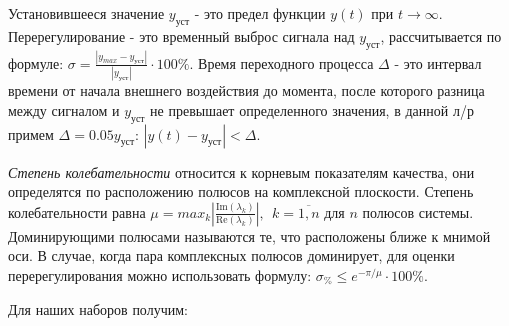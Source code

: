 \begin{par}
\begin{flushleft}
Установившееся значение $y_{\textrm{уст}}$ - это предел функции $y(t)$ при $t\to \infty$. Перерегулирование - это временный выброс сигнала над $y_{\textrm{уст}}$, рассчитывается по формуле: $\sigma =\frac{|y_{max} -y_{уст} |}{|y_{уст} |}\cdot 100\%$. Время переходного процесса $\Delta$ - это интервал времени от начала внешнего воздействия до момента, после которого разница между сигналом и $y_{\textrm{уст}}$ не превышает определенного значения, в данной л/р примем $\Delta =0.05y_{\textrm{уст}}$: $|y(t)-y_{\textrm{уст}} |<\Delta$.
\end{flushleft}
\end{par}

\begin{par}
\begin{flushleft}
\textit{Степень колебательности} относится к корневым показателям качества, они определятся по расположению полюсов на комплексной плоскости. Степень колебательности равна $\mu =max_k \left|\frac{\textrm{Im}(\lambda_k )}{\textrm{Re}(\lambda_k )}\right|,~~k=\overline{1,n}$ для $n$ полюсов системы. Доминирующими полюсами называются те, что расположены ближе к мнимой оси. В случае, когда пара комплексных полюсов доминирует, для оценки перерегулирования можно использовать формулу: $\sigma_{\%} \le e^{-\pi /\mu } \cdot 100\%$.
\end{flushleft}
\end{par}

\begin{par}
\begin{flushleft}
Для наших наборов получим:
\end{flushleft}
\end{par}

